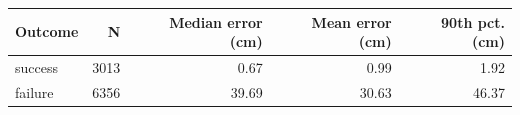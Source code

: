 \begin{tabular}{lrrrr}
\toprule
Outcome & N & Median error (cm) & Mean error (cm) & 90th pct. (cm) \\ 
\midrule
success & 3013 & 0.67 & 0.99 & 1.92 \\ 
failure & 6356 & 39.69 & 30.63 & 46.37 \\ 
\bottomrule
\end{tabular}
